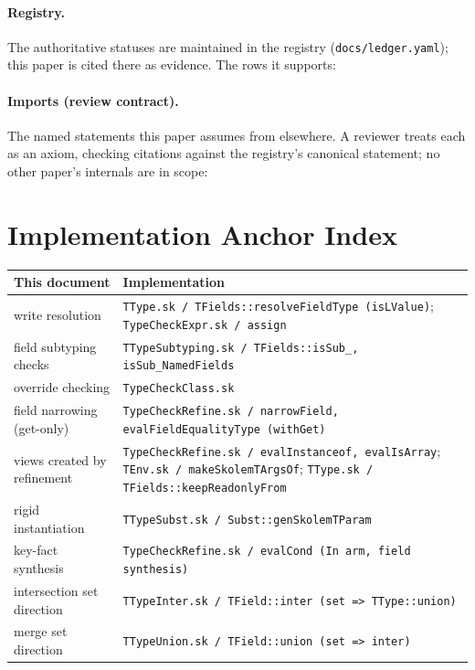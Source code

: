 \documentclass[11pt]{article}
\begin{document}
\paragraph{Registry.}
The authoritative statuses are maintained in the registry
(\texttt{docs/ledger.yaml}); this paper is cited there as evidence. The
rows it supports:



\paragraph{Imports (review contract).}
The named statements this paper assumes from elsewhere. A reviewer treats
each as an axiom, checking citations against the registry's canonical
statement; no other paper's internals are in scope:



\section{Implementation Anchor Index}
\label{sec:anchors}

\begin{center}
\renewcommand{\arraystretch}{1.2}
\small
\begin{tabular}{@{}p{4.6cm}>{\raggedright\arraybackslash}p{9.4cm}@{}}
\toprule
\textbf{This document} & \textbf{Implementation} \\
\midrule
write resolution & \texttt{TType.sk / TFields::resolveFieldType
  (isLValue)}; \texttt{TypeCheckExpr.sk / assign} \\
field subtyping checks & \texttt{TTypeSubtyping.sk /
  TFields::isSub\_, isSub\_NamedFields} \\
override checking & \texttt{TypeCheckClass.sk} \\
field narrowing (get-only) & \texttt{TypeCheckRefine.sk / narrowField,
  evalFieldEqualityType (withGet)} \\
views created by refinement & \texttt{TypeCheckRefine.sk / evalInstanceof,
  evalIsArray}; \texttt{TEnv.sk / makeSkolemTArgsOf}; \texttt{TType.sk
  / TFields::keepReadonlyFrom} \\
rigid instantiation & \texttt{TTypeSubst.sk / Subst::genSkolemTParam} \\
key-fact synthesis & \texttt{TypeCheckRefine.sk / evalCond (In arm,
  field synthesis)} \\
intersection set direction & \texttt{TTypeInter.sk / TField::inter
  (set => TType::union)} \\
merge set direction & \texttt{TTypeUnion.sk / TField::union
  (set => inter)} \\
\bottomrule
\end{tabular}
\end{center}
\end{document}
